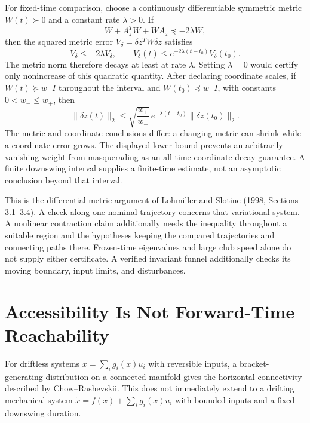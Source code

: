 \documentclass[12pt, openany]{book}
\theoremstyle{plain}
\begin{document}
For fixed-time comparison, choose a continuously differentiable symmetric
metric $W(t)\succ0$ and a constant rate $\lambda>0$. If
\begin{equation}
\dot W+A_z^TW+WA_z\preceq-2\lambda W,
\end{equation}
then the squared metric error $V_\delta=\delta z^TW\delta z$ satisfies
\begin{equation}
\dot V_\delta\leq-2\lambda V_\delta,\qquad
V_\delta(t)\leq e^{-2\lambda(t-t_0)}V_\delta(t_0).
\end{equation}
The metric norm therefore decays at least at rate $\lambda$. Setting
$\lambda=0$ would certify only nonincrease of this quadratic quantity.
After declaring coordinate scales, if $W(t)\succeq w_-I$ throughout the interval
and $W(t_0)\preceq w_+I$, with constants $0<w_-\leq w_+$, then
\begin{equation}
\|\delta z(t)\|_2\leq
\sqrt{\frac{w_+}{w_-}}\,e^{-\lambda(t-t_0)}\|\delta z(t_0)\|_2.
\end{equation}
The metric and coordinate conclusions differ: a changing metric can shrink
while a coordinate error grows. The displayed lower bound prevents an
arbitrarily vanishing weight from masquerading as an all-time coordinate
decay guarantee. A finite downswing interval supplies a finite-time estimate,
not an asymptotic conclusion beyond that interval.

This is the differential metric argument of \href{https://www.mit.edu/~nsl/preprints/contraction.pdf}{Lohmiller and Slotine (1998, Sections 3.1--3.4)}.
A check along one nominal trajectory concerns that variational system.
A nonlinear contraction claim additionally needs the inequality throughout
a suitable region and the hypotheses keeping the compared trajectories and
connecting paths there. Frozen-time eigenvalues and large club speed alone
do not supply either certificate. A verified invariant funnel additionally
checks its moving boundary, input limits, and disturbances.

\section{Accessibility Is Not Forward-Time Reachability}

For driftless systems $\dot x=\sum_i g_i(x)u_i$ with reversible inputs, a
bracket-generating distribution on a connected manifold gives the horizontal
connectivity described by Chow--Rashevskii. This does not immediately extend
to a drifting mechanical system $\dot x=f(x)+\sum_i g_i(x)u_i$ with bounded
inputs and a fixed downswing duration.
\end{document}

